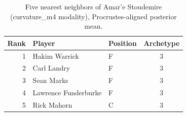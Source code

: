 \begin{table}[htbp]
  \centering\small
  \begin{tabular}{rllc}
    \toprule
    Rank & Player & Position & Archetype \\
    \midrule
    1 & Hakim Warrick & F & 3 \\
    2 & Carl Landry & F & 3 \\
    3 & Sean Marks & F & 3 \\
    4 & Lawrence Funderburke & F & 3 \\
    5 & Rick Mahorn & C & 3 \\
    \bottomrule
  \end{tabular}
  \caption{Five nearest neighbors of Amar'e Stoudemire (curvature_m4 modality), Procrustes-aligned posterior mean.}
  \label{tab:Amar_e_Stoudemire_neighbors_curvature_m4}
\end{table}

